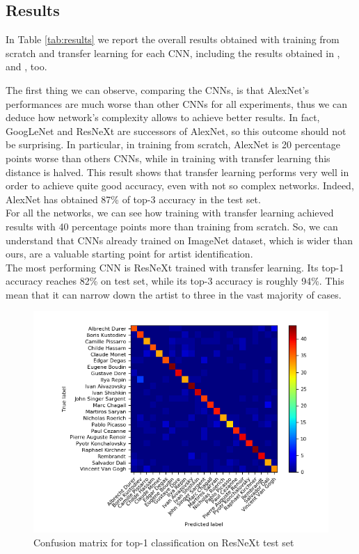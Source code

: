 \documentclass{article}
\begin{document}
\subsection{Results}\label{results}

In Table \ref{tab:results} we report the overall results obtained with training  from scratch and transfer learning for each CNN, including the results obtained in \cite{ArtistIdCNN406}, \cite{Saleh2015} and \cite{mensink2014}, too.

The first thing we can observe, comparing the CNNs, is that AlexNet's performances are much worse than other CNNs for all experiments, thus we can deduce how network's complexity allows to achieve better results. In fact, GoogLeNet and ResNeXt are successors of AlexNet, so this outcome should not be surprising. 
In particular, in training from scratch, AlexNet is 20 percentage points worse than others CNNs, while in training with transfer learning this distance is halved. This result shows that transfer learning performs very well in order to achieve quite good accuracy, even with not so complex networks. Indeed, AlexNet has obtained 87\% of top-3 accuracy in the test set.\\
For all the networks, we can see how training with transfer learning achieved results with 40 percentage points more than training from scratch. So, we can understand that CNNs already trained on ImageNet dataset, which is wider than ours, are a valuable starting point for artist identification.\\
The most performing CNN is ResNeXt trained with transfer learning. Its top-1 accuracy reaches 82\% on test set, while its top-3 accuracy is roughly 94\%. This mean that it can narrow down the artist to three in the vast majority of cases.

\begin{figure}[t]
	\centering
	\includegraphics[width=0.8\linewidth]{graphs/confusion}
	\caption{Confusion matrix for top-1 classification on ResNeXt test set}
	\label{fig:confusion}
\end{figure}
\end{document}
